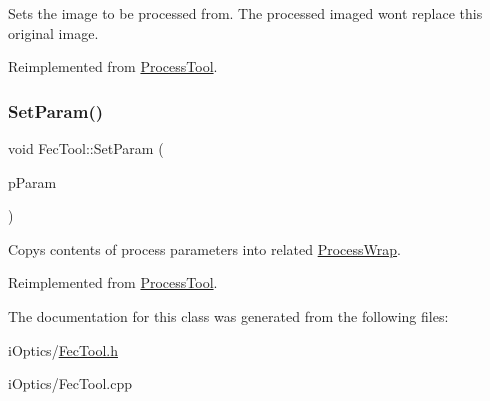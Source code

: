 Sets the image to be processed from. The processed imaged won\textquotesingle{}t replace this original image. 

Reimplemented from \mbox{\hyperlink{class_process_tool_a178bc06abf5a20220bd2306a14708a93}{Process\+Tool}}.

\mbox{\label{class_fec_tool_acd6cd4230cb79fe0cb1053c588f91806}} 
\subsubsection{\texorpdfstring{Set\+Param()}{SetParam()}}
{\footnotesize\ttfamily void Fec\+Tool\+::\+Set\+Param (\begin{DoxyParamCaption}\item[{\mbox{\hyperlink{class_process_wrap}{Process\+Wrap}} $\ast$}]{p\+Param }\end{DoxyParamCaption})\hspace{0.3cm}{\ttfamily [virtual]}}

Copys contents of process parameters into related \mbox{\hyperlink{class_process_wrap}{Process\+Wrap}}. 

Reimplemented from \mbox{\hyperlink{class_process_tool_a50caa175198cece00b39a146715bf3eb}{Process\+Tool}}.



The documentation for this class was generated from the following files\+:\begin{DoxyCompactItemize}
\item 
i\+Optics/\mbox{\hyperlink{_fec_tool_8h}{Fec\+Tool.\+h}}\item 
i\+Optics/Fec\+Tool.\+cpp\end{DoxyCompactItemize}
